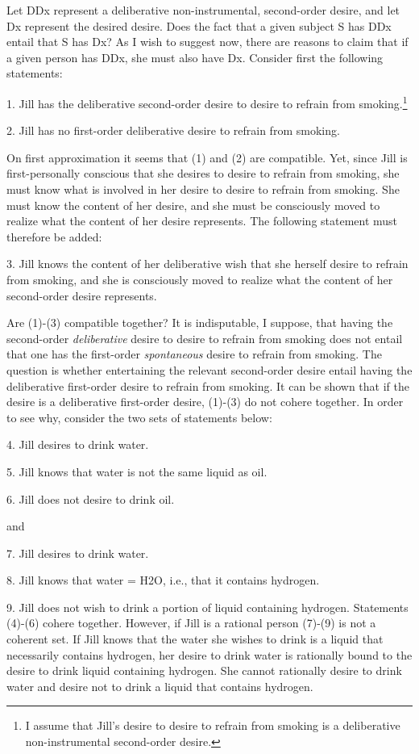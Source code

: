 \documentclass[output=paper,colorlinks,citecolor=brown
]{langscibook}
\begin{document}
Let DDx represent a deliberative non-instrumental, second-order desire, and let Dx represent the desired desire. Does the fact that a given subject S has DDx entail that S has Dx? As I wish to suggest now, there are reasons to claim that if a given person has DDx, she must also have Dx.
Consider first the following statements:

1.	Jill has the deliberative second-order desire to desire to refrain from smoking.\footnote{I assume that Jill's desire to desire to refrain from smoking is a deliberative non-instrumental second-order desire.}

2.	Jill has no first-order deliberative desire to refrain from smoking. 

On first approximation it seems that (1) and (2) are compatible. Yet, since Jill is first-personally conscious that she desires to desire to refrain from smoking, she must know what is involved in her desire to desire to refrain from smoking. She must know the content of her desire, and she must be consciously moved to realize what the content of her desire represents. The following statement must therefore be added: 

3.	Jill knows the content of her deliberative wish that she herself desire to refrain from smoking, and she is consciously moved to realize what the content of her second-order desire represents. 

Are (1)-(3) compatible together? It is indisputable, I suppose, that having the second-order \textit{deliberative} desire to desire to refrain from smoking does not entail that one has the first-order \textit{spontaneous} desire to refrain from smoking. The question is whether entertaining the relevant second-order desire entail having the deliberative first-order desire to refrain from smoking. It can be shown that if the desire is a deliberative first-order desire, (1)-(3) do not cohere together. In order to see why, consider the two sets of statements below:

4.	Jill desires to drink water.

5.	Jill knows that water is not the same liquid as oil. 

6.	Jill does not desire to drink oil.


and

7.	Jill desires to drink water.

8.	Jill knows that water = H2O, i.e., that it contains hydrogen.

9.	Jill does not wish to drink a portion of liquid containing hydrogen.
Statements (4)-(6) cohere together. However, if Jill is a rational person (7)-(9) is not a coherent set. If Jill knows that the water she wishes to drink is a liquid that necessarily contains hydrogen, her desire to drink water is rationally bound to the desire to drink liquid containing hydrogen. She cannot rationally desire to drink water and desire not to drink a liquid that contains hydrogen. 
\end{document}
